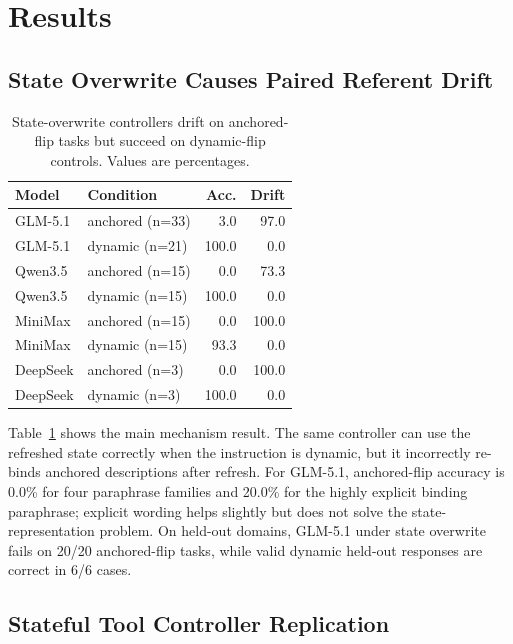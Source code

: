 \documentclass[letterpaper]{article}
\begin{document}
\section{Results}

\subsection{State Overwrite Causes Paired Referent Drift}

\begin{table}[t]
\centering
\small
\begin{tabular}{llrr}
\toprule
Model & Condition & Acc. & Drift \\
\midrule
GLM-5.1 & anchored (n=33) & 3.0 & 97.0 \\
GLM-5.1 & dynamic (n=21) & 100.0 & 0.0 \\
Qwen3.5 & anchored (n=15) & 0.0 & 73.3 \\
Qwen3.5 & dynamic (n=15) & 100.0 & 0.0 \\
MiniMax & anchored (n=15) & 0.0 & 100.0 \\
MiniMax & dynamic (n=15) & 93.3 & 0.0 \\
DeepSeek & anchored (n=3) & 0.0 & 100.0 \\
DeepSeek & dynamic (n=3) & 100.0 & 0.0 \\
\bottomrule
\end{tabular}
\caption{State-overwrite controllers drift on anchored-flip tasks but succeed on dynamic-flip controls. Values are percentages.}
\label{tab:main}
\end{table}

Table~\ref{tab:main} shows the main mechanism result. The same controller can use the refreshed state correctly when the instruction is dynamic, but it incorrectly re-binds anchored descriptions after refresh. For GLM-5.1, anchored-flip accuracy is 0.0\% for four paraphrase families and 20.0\% for the highly explicit binding paraphrase; explicit wording helps slightly but does not solve the state-representation problem. On held-out domains, GLM-5.1 under state overwrite fails on 20/20 anchored-flip tasks, while valid dynamic held-out responses are correct in 6/6 cases.

\subsection{Stateful Tool Controller Replication}
\end{document}

